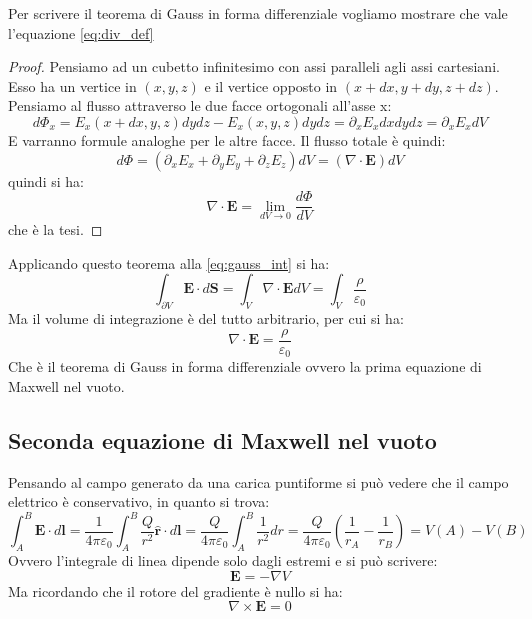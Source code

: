 \documentclass{article}
\renewcommand{\epsilon}{\varepsilon}
\newcommand{\mbf}{\mathbf}
\newcommand{\vers}[1]{\mbf{\hat #1 }}
\newcommand{\qpe}[1][1]{ \frac{ #1 }{ 4\pi\epsilon_0 } }
\numberwithin{equation}{section}
\begin{document}
Per scrivere il teorema di Gauss in forma differenziale vogliamo mostrare che vale l'equazione \ref{eq:div_def}
\begin{proof}
    Pensiamo ad un cubetto infinitesimo con assi paralleli agli assi cartesiani. Esso ha un vertice in $(x, y, z)$ e il vertice opposto in $(x + dx, y + dy, z + dz)$. Pensiamo al flusso attraverso le due facce ortogonali all'asse x:
    \begin{equation*}
        d\Phi_x = E_x(x + dx, y, z) dydz - E_x(x, y, z) dydz = \partial_x E_x dxdydz = \partial_x E_x dV
    \end{equation*}
    E varranno formule analoghe per le altre facce. Il flusso totale è quindi:
    \begin{equation*}
        d\Phi = (\partial_x E_x + \partial_y E_y + \partial_z E_z) dV = (\nabla \cdot \mbf E ) dV
    \end{equation*}
    quindi si ha:
    \begin{equation*}
        \nabla \cdot \mbf E 
        = \lim_{ dV \to 0 } \frac{ d\Phi }{ dV }
    \end{equation*}
    che è la tesi.
\end{proof}

Applicando questo teorema alla \ref{eq:gauss_int} si ha:
\begin{equation}
    \int_{\partial V} \mbf E \cdot d \mbf S = \int_V \nabla \cdot \mbf E dV = \int_V \frac{ \rho }{ \epsilon_0 } 
\end{equation}
Ma il volume di integrazione è del tutto arbitrario, per cui si ha:
\begin{equation} \label{eq:gauss_diff} 
    \nabla \cdot \mbf E = \frac{ \rho }{ \epsilon_0 } 
\end{equation}
Che è il teorema di Gauss in forma differenziale ovvero la prima equazione di Maxwell nel vuoto. 

\subsection{Seconda equazione di Maxwell nel vuoto} %
\label{sub:seconda_equazione_di_maxwell_nel_vuoto}

Pensando al campo generato da una carica puntiforme si può vedere che il campo elettrico è conservativo, in quanto si trova:
\begin{equation}
    \int_A^B \mbf E \cdot d \mbf l 
        = \qpe \int_A^B \frac{ Q }{ r^2 } \vers r \cdot d \mbf l 
        = \qpe[Q] \int_A^B \frac{ 1 }{ r^2 } dr
        = \qpe[Q] \left ( \frac{ 1 }{ r_A } - \frac{ 1 }{ r_B } \right )
        = V(A) - V(B)
\end{equation}
Ovvero l'integrale di linea dipende solo dagli estremi e si può scrivere:
\begin{equation}
    \mbf E = - \nabla V
\end{equation}
Ma ricordando che il rotore del gradiente è nullo si ha:
\begin{equation} \label{eq:rot_E_stat} 
    \nabla \times \mbf E = 0
\end{equation}
\end{document}

